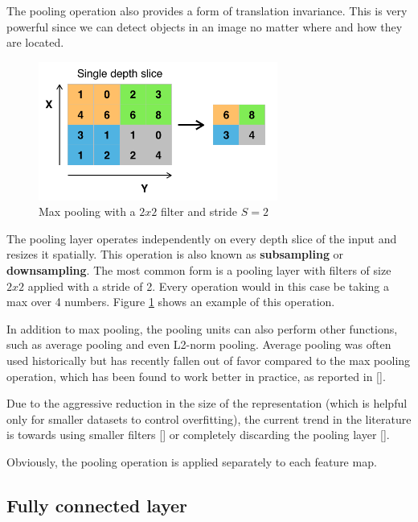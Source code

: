 The pooling operation also provides a form of translation invariance. This is very powerful since we can detect objects in an image no matter where and how they are located.

\begin{figure}[b]
	\centering
	\includegraphics[width=0.7\textwidth]{Images/max_pooling}
	\caption{Max pooling with a $2x2$ filter and stride $S=2$}\label{fig:max_pooling}
\end{figure}

The pooling layer operates independently on every depth slice of the input and resizes it spatially. This operation is also known as \textbf{subsampling} or \textbf{downsampling}. The most common form is a pooling layer with filters of size $2x2$ applied with a stride of 2. Every operation would in this case be taking a max over 4 numbers. Figure \ref{fig:max_pooling} shows an example of this operation.

In addition to max pooling, the pooling units can also perform other functions, such as average pooling and even L2-norm pooling. Average pooling was often used historically but has recently fallen out of favor compared to the max pooling operation, which has been found to work better in practice, as reported in [\cite{Scherer:2010}].

Due to the aggressive reduction in the size of the representation (which is helpful only for smaller datasets to control overfitting), the current trend in the literature is towards using smaller filters [\cite{DBLP:journals/corr/Graham14a}] or completely discarding the pooling layer [\cite{DBLP:journals/corr/SpringenbergDBR14}].

Obviously, the pooling operation is applied separately to each feature map.

\subsection{Fully connected layer}

